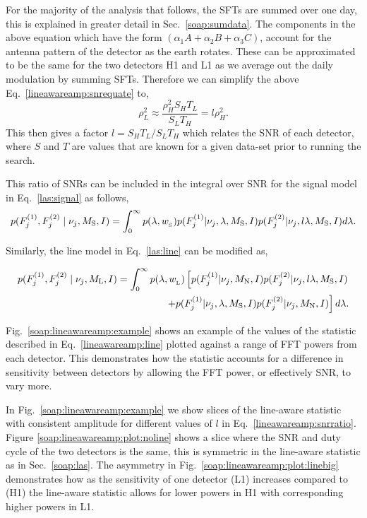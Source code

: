 For the majority of the analysis that follows, the \glspl{SFT} are summed over one day, this is explained in greater detail in Sec.~\ref{soap:sumdata}. 
The components in the above equation which have the form $(\alpha_1A +
\alpha_2B + \alpha_3C)$, account for the antenna pattern of the detector as the earth rotates.
These can be approximated to be the same for the two detectors H1 and L1 as we average out the daily modulation by summing \glspl{SFT}.
Therefore we can simplify the above Eq.~\ref{lineawareamp:snrequate} to, 
\begin{equation}
\label{lineawareamp:snrratio}
    \rho_L^2 \approx \frac{\rho_H^2 S_H T_L}{S_L T_H} = l \rho_H^2 .
\end{equation}
This then gives a factor $l = S_H T_L/S_L T_H$ which relates the \gls{SNR} of each detector, where $S$ and $T$ are values that are known for a given data-set prior to running the search.

This ratio of \glspl{SNR} can be included in the integral over \gls{SNR} for the signal model in Eq.~\ref{las:signal} as follows,
\begin{equation}
\label{lineawareamp:signal}
p(F^{(1)}_{j},F^{(2)}_{j} \mid \nu_j,M_{\rm{S}},I) = \int_0^{\infty}  p(\lambda,w_{\rm_S}) 
p(F^{(1)}_{j}|\nu_j,\lambda,M_{\text{S}},I)p(F^{(2)}_{j}|\nu_j,l\lambda,M_{\text{S}},I) d\lambda.
\end{equation}

Similarly, the line model in Eq.~\ref{las:line} can be modified as,

\begin{equation}
\label{lineawareamp:line}
\begin{split}
p(F^{(1)}_{j},F^{(2)}_{j} \mid \nu_j,M_{\rm{L}},I) = \int_0^{\infty}  p(\lambda,w_{\rm_L}) 
\left[ p(F^{(1)}_{j}|\nu_j,M_{\rm{N}},I)p(F^{(2)}_{j}|\nu_j,l\lambda,M_{\rm{S}},I) \right. \\
\left. + p(F^{(1)}_{j}|\nu_j,\lambda,M_{\rm{S}},I)p(F^{(2)}_{j}|\nu_j,M_{\rm{N}},I)\right]d\lambda .
\end{split}
\end{equation}

Fig.~\ref{soap:lineawareamp:example} shows an example of the values of the
statistic described in Eq.~\ref{lineawareamp:line} plotted against a range of
\gls{FFT} powers from each detector. This demonstrates how the statistic
accounts for a difference in sensitivity between detectors by allowing the \gls{FFT}
power, or effectively \gls{SNR}, to vary more.

In Fig.~\ref{soap:lineawareamp:example} we show slices of the line-aware statistic with consistent amplitude for different values of $l$ in Eq.~\ref{lineawareamp:snrratio}. 
Figure \ref{soap:lineawareamp:plot:noline} shows a slice where the \gls{SNR} and duty cycle of the two detectors is the same, this is symmetric in the line-aware statistic as in Sec.~\ref{soap:las}.
The asymmetry in Fig.~\ref{soap:lineawareamp:plot:linebig} demonstrates how as the sensitivity of one detector (L1) increases compared to (H1) the line-aware statistic allows for lower powers in H1 with corresponding higher powers in L1.



